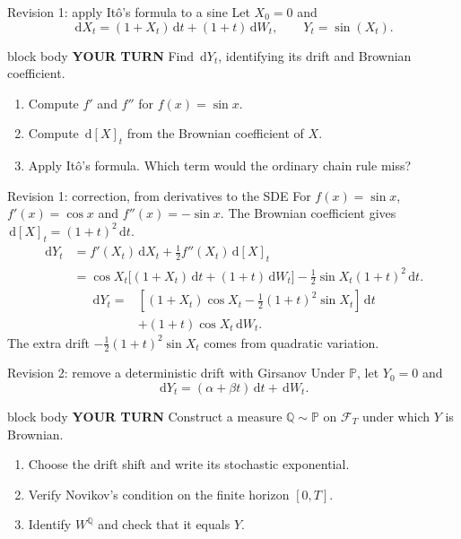 \documentclass[handout,10pt,aspectratio=169]{beamer}
\newenvironment{pausebox}{\begin{beamercolorbox}[rounded=true,sep=0.8em,wd=\textwidth]{block body}
  \textbf{\color{CourseGold}YOUR TURN}\quad}{\end{beamercolorbox}}
\newcommand{\dd}{\,\mathrm d}
\newcommand{\Pp}{\mathbb P}
\newcommand{\Q}{\mathbb Q}
\newcommand{\cF}{\mathcal F}
\newcommand{\1}{\mathbf 1}
\begin{document}
\begin{frame}{Revision 1: apply It\^o's formula to a sine}
Let \(X_0=0\) and
\[
\dd X_t=(1+X_t)\dd t+(1+t)\dd W_t,
\qquad Y_t=\sin(X_t).
\]
\begin{pausebox}
Find \(\dd Y_t\), identifying its drift and Brownian coefficient.
\end{pausebox}
\begin{enumerate}
  \item Compute \(f'\) and \(f''\) for \(f(x)=\sin x\).
  \item Compute \(\dd[X]_t\) from the Brownian coefficient of \(X\).
  \item Apply It\^o's formula. Which term would the ordinary chain rule miss?
\end{enumerate}
\end{frame}

\begin{frame}{Revision 1: correction, from derivatives to the SDE}
For \(f(x)=\sin x\), \(f'(x)=\cos x\) and \(f''(x)=-\sin x\).
The Brownian coefficient gives \(\dd[X]_t=(1+t)^2\dd t\).
\[
\begin{aligned}
\dd Y_t
&=f'(X_t)\dd X_t+\tfrac12 f''(X_t)\dd[X]_t\\
&=\cos X_t\bigl[(1+X_t)\dd t+(1+t)\dd W_t\bigr]
 -\tfrac12\sin X_t(1+t)^2\dd t.
\end{aligned}
\]
\[
\boxed{\begin{aligned}
\dd Y_t={}&\left[(1+X_t)\cos X_t
-\tfrac12(1+t)^2\sin X_t\right]\dd t\\
&+(1+t)\cos X_t\dd W_t.
\end{aligned}}
\]
The extra drift \(-\tfrac12(1+t)^2\sin X_t\) comes from quadratic variation.
\end{frame}

\begin{frame}{Revision 2: remove a deterministic drift with Girsanov}
Under \(\Pp\), let \(Y_0=0\) and
\[\dd Y_t=(\alpha+\beta t)\dd t+\dd W_t.\]
\begin{pausebox}
Construct a measure \(\Q\sim\Pp\) on \(\cF_T\) under which \(Y\) is Brownian.
\end{pausebox}
\begin{enumerate}
  \item Choose the drift shift and write its stochastic exponential.
  \item Verify Novikov's condition on the finite horizon \([0,T]\).
  \item Identify \(W^\Q\) and check that it equals \(Y\).
\end{enumerate}
\end{frame}
\end{document}
